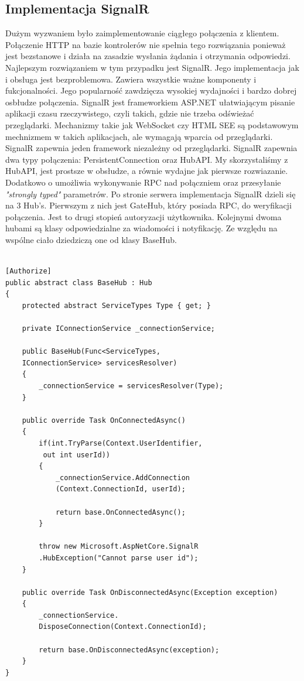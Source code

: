 \documentclass[12pt,a4paper]{article}
\begin{document}
\subsection{Implementacja SignalR}	
\hspace*{0.7cm} Dużym wyzwaniem było zaimplementowanie ciągłego połączenia z klientem. Połączenie HTTP na bazie kontrolerów nie spełnia tego rozwiązania ponieważ jest bezstanowe i działa na zasadzie wysłania żądania i otrzymania odpowiedzi. Najlepszym rozwiązaniem w tym przypadku jest SignalR. Jego implementacja jak i obsługa jest bezproblemowa. Zawiera wszystkie ważne komponenty i fukcjonalności. Jego popularność zawdzięcza wysokiej wydajności i bardzo dobrej osbłudze połączenia. \newline
\hspace*{0.7cm} SignalR jest frameworkiem ASP.NET ułatwiającym pisanie aplikacji czasu rzeczywistego, czyli takich, gdzie nie trzeba odświeżać przeglądarki. Mechanizmy takie jak WebSocket czy HTML SEE są podstawowym mechnizmem w takich aplikacjach, ale wymagają wparcia od przeglądarki. SignalR zapewnia jeden framework niezależny od przeglądarki. \newline
\hspace*{0.7cm} SignalR zapewnia dwa typy połączenia: PersistentConnection oraz HubAPI. My skorzystaliśmy z HubAPI, jest prostsze w obsłudze, a równie wydajne jak pierwsze rozwiazanie. Dodatkowo o umożliwia wykonywanie RPC nad połączniem oraz przesyłanie \textit{"strongly typed"} parametrów. \newline
\hspace*{0.7cm} Po stronie serwera implementacja SignalR dzieli się na 3 Hub's. Pierwszym z nich jest GateHub, który posiada RPC, do weryfikacji połączenia. Jest to drugi stopień autoryzacji użytkownika. Kolejnymi dwoma hubami są klasy odpowiedzialne za wiadomości i notyfikację. Ze względu na wspólne ciało dziedziczą one od klasy BaseHub.

\begin{lstlisting}[caption={Implementacja Klasy BaseHub}]

[Authorize]
public abstract class BaseHub : Hub
{
	protected abstract ServiceTypes Type { get; }
	
	private IConnectionService _connectionService;
	
	public BaseHub(Func<ServiceTypes, 
	IConnectionService> servicesResolver)
	{
		_connectionService = servicesResolver(Type);
	}
	
	public override Task OnConnectedAsync()
	{
		if(int.TryParse(Context.UserIdentifier,
		 out int userId))
		{
			_connectionService.AddConnection
			(Context.ConnectionId, userId);
		
			return base.OnConnectedAsync();
		}
	
		throw new Microsoft.AspNetCore.SignalR
		.HubException("Cannot parse user id");
	}
	
	public override Task OnDisconnectedAsync(Exception exception)
	{
		_connectionService.
		DisposeConnection(Context.ConnectionId);
	
		return base.OnDisconnectedAsync(exception);
	}
}
\end{lstlisting}
\end{document}
